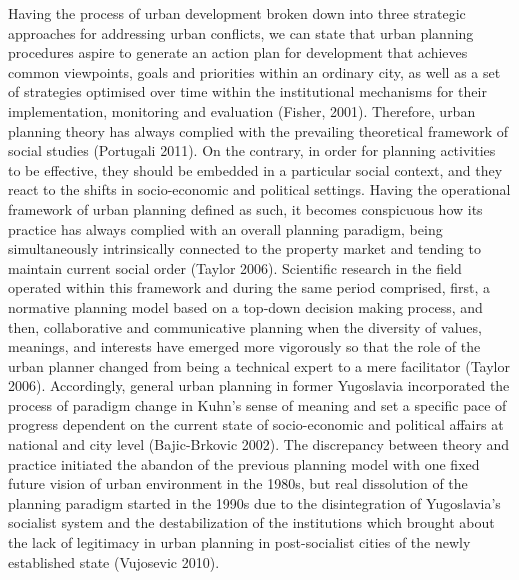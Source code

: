 \documentclass[11pt]{report}
\begin{document}
Having the process of urban development broken down into three strategic approaches for addressing urban conflicts, we can state that urban planning procedures aspire to generate an action plan for development that achieves common viewpoints, goals and priorities within an ordinary city, as well as a set of strategies optimised over time within the institutional mechanisms for their implementation, monitoring and evaluation (Fisher, 2001).
Therefore, urban planning theory has always complied with the prevailing theoretical framework of social studies (Portugali 2011). On the contrary, in order for planning activities to be effective, they should be embedded in a particular social context, and they react to the shifts in socio-economic and political settings. Having the operational framework of urban planning defined as such, it becomes conspicuous how its practice has always complied with an overall planning paradigm, being simultaneously intrinsically connected to the property market and tending to maintain current social order (Taylor 2006). Scientific research in the field operated within this framework and during the same period comprised, first, a normative planning model based on a top-down decision making process, and then, collaborative and communicative planning when the diversity of values, meanings, and interests have emerged more vigorously so that the role of the urban planner changed from being a technical expert to a mere facilitator (Taylor 2006).
Accordingly, general urban planning in former Yugoslavia incorporated the process of paradigm change in Kuhn’s sense of meaning and set a specific pace of progress dependent on the current state of socio-economic and political affairs at national and city level (Bajic-Brkovic 2002). The discrepancy between theory and practice initiated the abandon of the previous planning model with one fixed future vision of urban environment in the 1980s, but real dissolution of the planning paradigm started in the 1990s due to the disintegration of Yugoslavia’s socialist system and the destabilization of the institutions which brought about the lack of legitimacy in urban planning in post-socialist cities of the newly established state (Vujosevic 2010).
\end{document}
